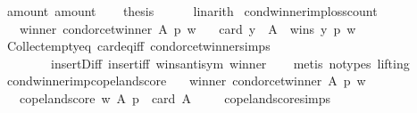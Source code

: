 \begin{isabellebody}
\ amount{}\ amount{}\isanewline
\ \ \isamarkupfalse%
\ {\isacharquery}{\kern0pt}thesis\isanewline
\ \ \ \ \isamarkupfalse%
\ linarith\isanewline
{}\isamarkupfalse%
%
\endisatagproof
{\isafoldproof}%
%
\isadelimproof
\isanewline
%
\endisadelimproof
\isanewline
\isanewline
{}\isamarkupfalse%
\ cond{\isacharunderscore}{\kern0pt}winner{\isacharunderscore}{\kern0pt}imp{\isacharunderscore}{\kern0pt}loss{\isacharunderscore}{\kern0pt}count{\isacharcolon}{\kern0pt}\isanewline
\ \ \ winner{\isacharcolon}{\kern0pt}\ {\isachardoublequoteopen}condorcet{\isacharunderscore}{\kern0pt}winner\ A\ p\ w{\isachardoublequoteclose}\isanewline
\ \ \ {\isachardoublequoteopen}card\ {\isacharbraceleft}{\kern0pt}y\ {\isasymin}\ A\ {\isachardot}{\kern0pt}\ wins\ y\ p\ w{\isacharbraceright}{\kern0pt}\ {\isacharequal}{\kern0pt}\ {}{\isachardoublequoteclose}\isanewline
%
\isadelimproof
\ \ %
\endisadelimproof
%
\isatagproof
{}\isamarkupfalse%
\ Collect{\isacharunderscore}{\kern0pt}empty{\isacharunderscore}{\kern0pt}eq\ card{\isacharunderscore}{\kern0pt}eq{\isacharunderscore}{\kern0pt}{}{\isacharunderscore}{\kern0pt}iff\ condorcet{\isacharunderscore}{\kern0pt}winner{\isachardot}{\kern0pt}simps\isanewline
\ \ \ \ \ \ \ \ insert{\isacharunderscore}{\kern0pt}Diff\ insert{\isacharunderscore}{\kern0pt}iff\ wins{\isacharunderscore}{\kern0pt}antisym\ winner\isanewline
\ \ \isamarkupfalse%
\ {\isacharparenleft}{\kern0pt}metis\ {\isacharparenleft}{\kern0pt}no{\isacharunderscore}{\kern0pt}types{\isacharcomma}{\kern0pt}\ lifting{\isacharparenright}{\kern0pt}{\isacharparenright}{\kern0pt}%
\endisatagproof
{\isafoldproof}%
%
\isadelimproof
\isanewline
%
\endisadelimproof
\isanewline
\isanewline
{}\isamarkupfalse%
\ cond{\isacharunderscore}{\kern0pt}winner{\isacharunderscore}{\kern0pt}imp{\isacharunderscore}{\kern0pt}copeland{\isacharunderscore}{\kern0pt}score{\isacharcolon}{\kern0pt}\isanewline
\ \ \ winner{\isacharcolon}{\kern0pt}\ {\isachardoublequoteopen}condorcet{\isacharunderscore}{\kern0pt}winner\ A\ p\ w{\isachardoublequoteclose}\isanewline
\ \ \ {\isachardoublequoteopen}copeland{\isacharunderscore}{\kern0pt}score\ w\ A\ p\ {\isacharequal}{\kern0pt}\ card\ A\ {\isacharminus}{\kern0pt}{}{\isachardoublequoteclose}\isanewline
%
\isadelimproof
\ \ %
\endisadelimproof
%
\isatagproof
{}\isamarkupfalse%
\ copeland{\isacharunderscore}{\kern0pt}score{\isachardot}{\kern0pt}simps\isanewline

\end{isabellebody}
